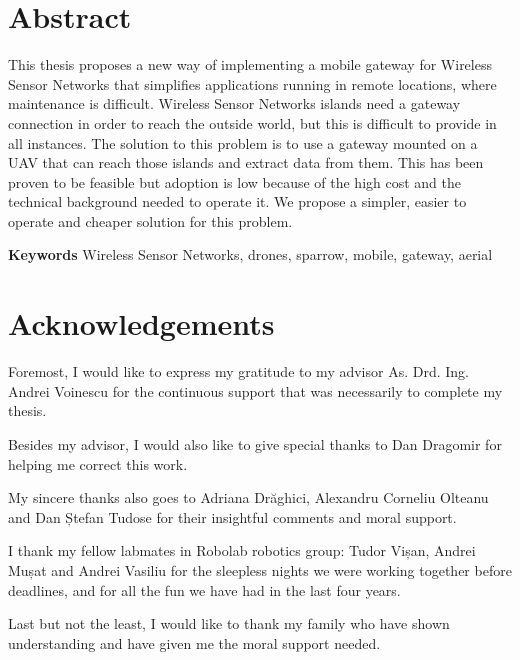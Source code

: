 \chapter*{Abstract}

This thesis proposes a new way of implementing a mobile gateway for Wireless Sensor Networks that simplifies applications running in remote locations, where maintenance is difficult. Wireless Sensor Networks islands need a gateway connection in order to reach the outside world, but this is difficult to provide in all instances.  The solution to this problem is to use a gateway mounted on a UAV that can reach those islands and extract data from them. This has been proven to be feasible but adoption is low because of the high cost and the technical background needed to operate it. We propose a simpler, easier to operate and cheaper solution for this problem.


 

\textbf{Keywords} Wireless Sensor Networks, drones, sparrow, mobile, gateway, aerial

\chapter*{Acknowledgements}

Foremost, I would like to express my gratitude to my advisor As. Drd. Ing. Andrei Voinescu for the continuous support that was necessarily to complete my thesis.

Besides my advisor, I would also like to give special thanks to Dan Dragomir for helping me correct this work. 
  
My sincere thanks also goes to Adriana Drăghici, Alexandru Corneliu Olteanu and Dan Ștefan Tudose for their insightful comments  and moral support.

I thank my fellow labmates in Robolab robotics group: Tudor Vișan, Andrei Mușat and Andrei Vasiliu for the sleepless nights we were working together before deadlines, and for all the fun we have had in the last four years.

Last but not the least, I would like to thank my family who have shown understanding and have given me the moral support needed.

